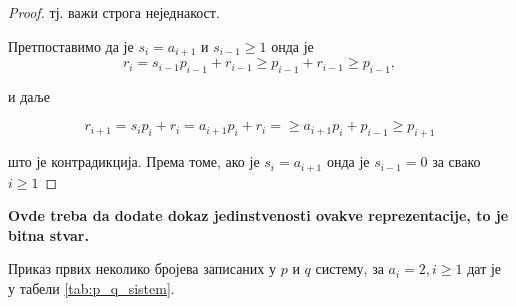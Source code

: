 \documentclass[a4paper]{article}
\begin{document}
\begin{proof}
	тј. важи строга неједнакост.
	
	Претпоставимо да је $ s_{i} = a_{i+1} $ и $ s_{i-1} \geq 1 $ онда је 
	\begin{displaymath}
		r_{i} = s_{i-1}p_{i-1} + r_{i-1} \geq p_{i-1} + r_{i-1} \geq p_{i-1},
	\end{displaymath}
	
	и даље
	
	\begin{displaymath}
		r_{i+1} = s_{i}p_{i} + r_{i} = a_{i+1}p_{i} + r_{i} = \geq a_{i+1}p_{i} + p_{i-1} \geq p_{i+1}
	\end{displaymath}
	
	што је контрадикција. Према томе, ако је $ s_{i} = a_{i+1} $ онда је $ s_{i-1} = 0 $ за свако $ i \ge 1 $
\end{proof}

\textbf{Ovde treba da dodate dokaz jedinstvenosti ovakve reprezentacije, to je bitna stvar.}

Приказ првих неколико бројева записаних у $ p $ и $ q $ систему, за $ a_{i} = 2 , i \ge 1 $ дат је у табели \ref{tab:p_q_sistem}.
\end{document}
